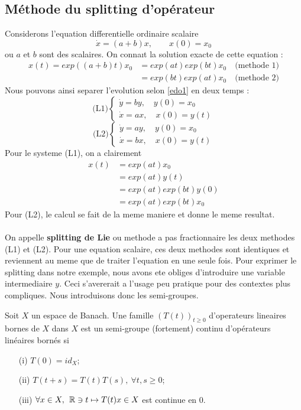 \subsection{Méthode du splitting d’opérateur}
Considerons l’equation differentielle ordinaire scalaire
\begin{equation} \label{edo1}
\dot{x}=(a+b)x, \quad \quad x(0)=x_0
\end{equation}
ou $a$ et $b$ sont des scalaires. On connaıt la solution exacte de cette equation :
\begin{align*}
x(t)=exp((a+b)t)x_0 &= exp(at)exp(bt)x_0 \quad \mbox{(methode 1)}\\
&= exp(bt)exp(at)x_0 \quad \mbox{(methode 2)}
\end{align*}
Nous pouvons ainsi separer l'evolution selon \eqref{edo1} en deux temps :
$$\mbox{(L1)}
\begin{cases}
\dot{y}=by,\quad y(0)=x_0\\
\dot{x}=ax,\quad x(0)=y(t)
\end{cases}
$$
$$\mbox{(L2)}
\begin{cases}
\dot{y}=ay,\quad y(0)=x_0\\
\dot{x}=bx,\quad x(0)=y(t)
\end{cases}
$$
Pour le systeme (L1), on a clairement
\begin{align*}
x(t) &= exp(at)x_0\\
&= exp(at)y(t)\\
&= exp(at)exp(bt)y(0)\\
&= exp(at)exp(bt)x_0
\end{align*}
Pour (L2), le calcul se fait de la meme maniere et donne le meme resultat.\\\\
On appelle \textbf{splitting de Lie} ou methode a pas fractionnaire les deux methodes (L1) et (L2). Pour une equation scalaire, ces deux methodes sont identiques et reviennent au meme que de traiter l’equation en une seule fois.
Pour exprimer le splitting dans notre exemple, nous avons ete obliges d’introduire une variable intermediaire $y$. Ceci s’avererait a l’usage peu pratique pour des contextes plus compliques. Nous introduisons donc les semi-groupes.
\begin{definition}
Soit $X$ un espace de Banach. Une famille $(T(t))_{t \geq 0}$ d'operateurs lineaires bornes de $X$ dans $X$ est un semi-groupe (fortement) continu d'opérateurs linéaires bornés si
\begin{enumerate}
	\item[(i)] $T(0)=id_X$;
	\item[(ii)] $T(t+s)=T(t)T(s), \: \forall t, s \geq 0$;
	\item[(iii)] $\forall x \in X, \:\: \mathbb R \ni t \mapsto T(t)x \in X$ est continue en $0$.  
\end{enumerate}
\end{definition}
